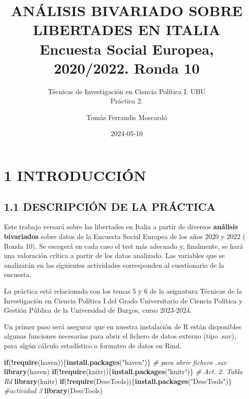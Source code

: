 \documentclass[
  12 pt,
  a4paper,
]{article}
\title{ANÁLISIS BIVARIADO SOBRE LIBERTADES EN ITALIA\\
Encuesta Social Europea, 2020/2022. Ronda 10}
\subtitle{Técnicas de Investigación en Ciencia Política I. UBU\\
Práctica 2.}
\author{Tomàs Ferrandis Moscardó}
\date{2024-05-10}
\newenvironment{Shaded}{\begin{snugshade}}{\end{snugshade}}
\newcommand{\CommentTok}[1]{\textcolor[rgb]{0.56,0.35,0.01}{\textit{#1}}}
\newcommand{\ControlFlowTok}[1]{\textcolor[rgb]{0.13,0.29,0.53}{\textbf{#1}}}
\newcommand{\FunctionTok}[1]{\textcolor[rgb]{0.13,0.29,0.53}{\textbf{#1}}}
\newcommand{\NormalTok}[1]{#1}
\newcommand{\SpecialCharTok}[1]{\textcolor[rgb]{0.81,0.36,0.00}{\textbf{#1}}}
\newcommand{\StringTok}[1]{\textcolor[rgb]{0.31,0.60,0.02}{#1}}
\begin{document}
\maketitle

{
\setcounter{tocdepth}{2}
\tableofcontents
}
\newpage

\renewcommand\tablename{Tabla}

\section{1 INTRODUCCIÓN}\label{introducciuxf3n}

\subsection{1.1 DESCRIPCIÓN DE LA
PRÁCTICA}\label{descripciuxf3n-de-la-pruxe1ctica}

Este trabajo versará sobre las libertades en Italia a partir de diversos
\textbf{análisis bivariados} sobre datos de la Encuesta Social Europea
de los años 2020 y 2022 ( Ronda 10). Se escogerá en cada caso el test
más adecuado y, finalmente, se hará una valoración crítica a partir de
los datos analizado. Las variables que se analizarán en las siguientes
actividades corresponden al cuestionario de la encuesta.

La práctica está relacionada con los temas 5 y 6 de la asignatura
Técnicas de la Investigación en Ciencia Política I del Grado
Universitario de Ciencia Política y Gestión Pública de la Universidad de
Burgos, curso 2023-2024.

Un primer paso será asegurar que en nuestra instalación de R están
disponibles algunas funciones necesarias para abrir el fichero de datos
externo (tipo .sav), para algún cálculo estadístico o formateo de datos
en Rmd.

\begin{Shaded}
\begin{Highlighting}[]
\ControlFlowTok{if}\NormalTok{(}\SpecialCharTok{!}\FunctionTok{require}\NormalTok{(haven))\{}\FunctionTok{install.packages}\NormalTok{(}\StringTok{"haven"}\NormalTok{)\} }\CommentTok{\# para abrir fichero .sav}
\FunctionTok{library}\NormalTok{(haven)}
\ControlFlowTok{if}\NormalTok{(}\SpecialCharTok{!}\FunctionTok{require}\NormalTok{(knitr))\{}\FunctionTok{install.packages}\NormalTok{(}\StringTok{"knitr"}\NormalTok{)\} }\CommentTok{\# Act. 2. Tabla Rd}
\FunctionTok{library}\NormalTok{(knitr)}
\ControlFlowTok{if}\NormalTok{(}\SpecialCharTok{!}\FunctionTok{require}\NormalTok{(DescTools))\{}\FunctionTok{install.packages}\NormalTok{(}\StringTok{"DescTools"}\NormalTok{)\} }\CommentTok{\#actividad 3}
\FunctionTok{library}\NormalTok{(DescTools)}
\end{Highlighting}
\end{Shaded}
\end{document}
